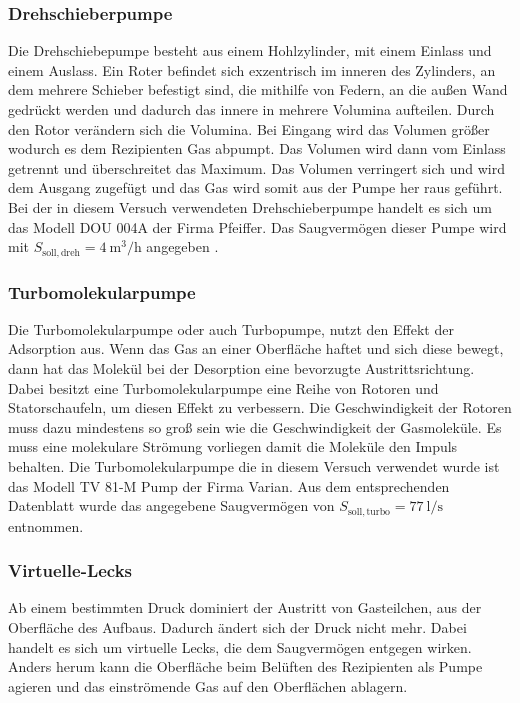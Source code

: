 \subsubsection{Drehschieberpumpe}
Die Drehschiebepumpe besteht aus einem Hohlzylinder, mit einem Einlass und einem Auslass. Ein Roter befindet sich exzentrisch im inneren des Zylinders, an dem mehrere Schieber befestigt sind, die mithilfe von Federn, an die außen Wand gedrückt werden und dadurch das innere in mehrere Volumina aufteilen. Durch den Rotor verändern sich die Volumina. Bei Eingang wird das Volumen größer wodurch es dem Rezipienten Gas abpumpt. Das Volumen wird dann vom Einlass getrennt und überschreitet das Maximum. Das Volumen verringert sich  und wird dem Ausgang zugefügt und das Gas wird somit aus der Pumpe her raus geführt.
Bei der in diesem Versuch verwendeten Drehschieberpumpe handelt es sich um das Modell DOU 004A der Firma Pfeiffer. Das Saugvermögen dieser Pumpe wird mit $S_{\mathrm{soll,dreh}} =\SI{4}{\m\cubed\per\hour}$ angegeben \cite{PlaketteV70}.


\subsubsection{Turbomolekularpumpe}
Die Turbomolekularpumpe oder auch Turbopumpe, nutzt den Effekt der Adsorption aus. Wenn das Gas an einer Oberfläche haftet und sich diese bewegt, dann hat das Molekül bei der Desorption eine bevorzugte Austrittsrichtung. Dabei besitzt eine Turbomolekularpumpe eine Reihe von Rotoren und Statorschaufeln, um diesen Effekt zu verbessern. Die Geschwindigkeit der Rotoren muss dazu mindestens so groß sein wie die Geschwindigkeit der Gasmoleküle. Es muss eine molekulare Strömung vorliegen damit die Moleküle den Impuls behalten.
Die Turbomolekularpumpe die in diesem Versuch verwendet wurde ist
das Modell TV 81-M Pump der Firma Varian. Aus dem entsprechenden Datenblatt 
\cite{DatenblattV70} wurde das angegebene Saugvermögen von 	
$S_{\mathrm{soll,turbo}} = \SI{77}{\l\per\s}$ entnommen.

\subsubsection{Virtuelle-Lecks}
Ab einem bestimmten Druck dominiert der Austritt von Gasteilchen, aus der Oberfläche des Aufbaus. Dadurch ändert sich der Druck nicht mehr. Dabei handelt es sich um virtuelle Lecks, die dem Saugvermögen entgegen wirken. Anders herum kann die Oberfläche beim Belüften des Rezipienten als Pumpe agieren und das einströmende Gas auf den Oberflächen ablagern.
